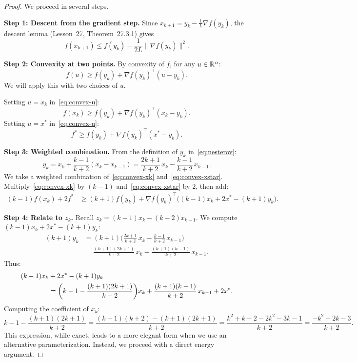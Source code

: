 \documentclass[11pt,a4paper]{article}
\begin{document}
\begin{proof}
We proceed in several steps.

\textbf{Step 1: Descent from the gradient step.}
Since $x_{k+1} = y_k - \frac{1}{L}\nabla f(y_k)$, the descent lemma
(Lesson~27, Theorem~27.3.1) gives
\begin{equation}\label{eq:descent-step}
  f(x_{k+1}) \le f(y_k) - \frac{1}{2L}\|\nabla f(y_k)\|^2.
\end{equation}

\textbf{Step 2: Convexity at two points.}
By convexity of $f$, for any $u \in \mathbb{R}^n$:
\begin{equation}\label{eq:convex-u}
  f(u) \ge f(y_k) + \nabla f(y_k)^\top(u - y_k).
\end{equation}
We will apply this with two choices of $u$.

Setting $u = x_k$ in~\eqref{eq:convex-u}:
\begin{equation}\label{eq:convex-xk}
  f(x_k) \ge f(y_k) + \nabla f(y_k)^\top(x_k - y_k).
\end{equation}
Setting $u = x^*$ in~\eqref{eq:convex-u}:
\begin{equation}\label{eq:convex-xstar}
  f^* \ge f(y_k) + \nabla f(y_k)^\top(x^* - y_k).
\end{equation}

\textbf{Step 3: Weighted combination.}
From the definition of $y_k$ in~\eqref{eq:nesterov}:
\[
  y_k = x_k + \frac{k-1}{k+2}(x_k - x_{k-1})
  = \frac{2k+1}{k+2}\,x_k - \frac{k-1}{k+2}\,x_{k-1}.
\]
We take a weighted combination of~\eqref{eq:convex-xk}
and~\eqref{eq:convex-xstar}. Multiply~\eqref{eq:convex-xk} by
$(k-1)$ and~\eqref{eq:convex-xstar} by $2$, then add:
\begin{align}
  (k-1)f(x_k) + 2f^*
  &\ge (k+1)f(y_k) + \nabla f(y_k)^\top\bigl((k-1)x_k + 2x^*
    - (k+1)y_k\bigr). \label{eq:weighted-combo}
\end{align}

\textbf{Step 4: Relate to $z_k$.}
Recall $z_k = (k-1)x_k - (k-2)x_{k-1}$. We compute
$(k-1)x_k + 2x^* - (k+1)y_k$:
\begin{align*}
  (k+1)y_k &= (k+1)\biggl(\frac{2k+1}{k+2}\,x_k
    - \frac{k-1}{k+2}\,x_{k-1}\biggr) \\
  &= \frac{(k+1)(2k+1)}{k+2}\,x_k
    - \frac{(k+1)(k-1)}{k+2}\,x_{k-1}.
\end{align*}
Thus:
\begin{align}
  (k-1)x_k &+ 2x^* - (k+1)y_k \notag \\
  &= \biggl(k-1 - \frac{(k+1)(2k+1)}{k+2}\biggr)x_k
    + \frac{(k+1)(k-1)}{k+2}\,x_{k-1} + 2x^*. \label{eq:coeff-compute}
\end{align}
Computing the coefficient of $x_k$:
\[
  k-1 - \frac{(k+1)(2k+1)}{k+2}
  = \frac{(k-1)(k+2) - (k+1)(2k+1)}{k+2}
  = \frac{k^2+k-2 - 2k^2-3k-1}{k+2}
  = \frac{-k^2-2k-3}{k+2}.
\]
This expression, while exact, leads to a more elegant form when we use
an alternative parameterization. Instead, we proceed with a direct
energy argument.


\end{proof}
\end{document}
